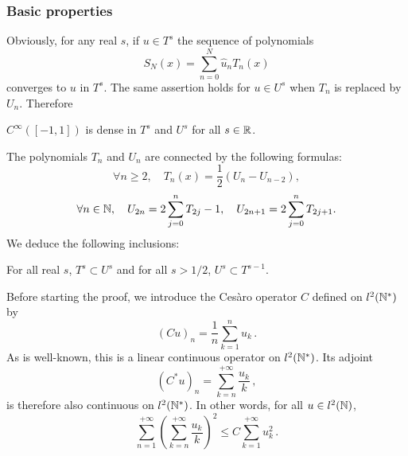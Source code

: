 \documentclass[a4paper]{article}
\begin{document}
\subsubsection{Basic properties}

Obviously, for any real $s$, if $u \in T^s$ the sequence of polynomials 
\[S_N(x) = \sum_{n=0}^{N} \hat{u}_n T_n(x)\]
converges to $u$ in $T^s$. The same assertion holds for $u \in U^s$ when $T_n$ is replaced by $U_n$. Therefore
\begin{Lem}
	\label{densite}
	$C^{\infty}([-1,1])$ is dense in $T^s$ and $U^s$ for all $s \in \mathbb{R}$.
\end{Lem}
\noindent The polynomials $T_n$ and $U_n$ are connected by the following formulas:
\begin{equation}
\label{TnAsUn}
\forall n \geq 2, \quad T_n(x) = \frac{1}{2}\left(U_n - U_{n-2}\right),
\end{equation}
\begin{equation}
\label{UnAsTn}
\forall n \in \mathbb{N}, \quad U_{2n} = 2\sum_{j = 0}^n T_{2j} - 1, \quad U_{2n+1} = 2\sum_{j=0}^n T_{2j+1}.
\end{equation}
We deduce the following inclusions:
\begin{Lem}
	\label{inclusionsTsUs}
	For all real $s$, $T^s \subset U^s$ and for all $s > 1/2$, $U^s \subset T^{s-1}$.
\end{Lem}
Before starting the proof, we introduce the Cesàro operator $C$ defined on $l^2(\mathbb{N}^{*})$ by
\[(Cu)_n = \frac{1}{n}\sum_{k=1}^n u_k\,.\]
As is well-known, this is a linear continuous operator on $l^2(\mathbb{N}^*)$. Its adjoint
\[(C^* u)_n = \sum_{k = n}^{+ \infty} \frac{u_k}{k} \,,\]
is therefore also continuous on $l^2(\mathbb{N}^*)$. In other words, for all $u \in l^2(\mathbb{N})$, 
\[ \sum_{n = 1}^{+ \infty} \left(\sum_{k = n}^{+ \infty} \frac{u_k}{k}\right)^2 \leq C \sum_{k = 1}^{+ \infty} u_k^2\, .\]
\end{document}
